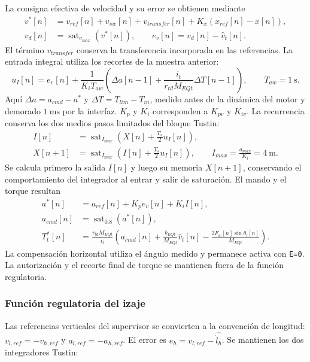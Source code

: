 \documentclass[a4paper,10pt,onecolumn,journal]{ieeeconf}
\numberwithin{equation}{section}
\begin{document}
La consigna efectiva de velocidad y su error se obtienen mediante
\begin{align}
v^*[n]&=v_{ref}[n]+v_{sw}[n]+v_{transfer}[n]+K_x(x_{ref}[n]-x[n]),\\
v_d[n]&=\operatorname{sat}_{v_{max}}(v^*[n]),\qquad e_v[n]=v_d[n]-\widehat v_t[n].
\end{align}
El término $v_{transfer}$ conserva la transferencia incorporada en las referencias. La entrada integral utiliza los recortes de la muestra anterior:
\begin{equation}
u_I[n]=e_v[n]+\frac{1}{K_iT_{aw}}\left(\Delta a[n-1]+\frac{i_t}{r_{td}M_{EQt}}\Delta T[n-1]\right),\qquad T_{aw}=1~\mathrm{s}.
\end{equation}
Aquí $\Delta a=a_{cmd}-a^*$ y $\Delta T=T_{lim}-T_{in}$, medido antes de la dinámica del motor y demorado $1~\mathrm{ms}$ por la interfaz. $K_p$ y $K_i$ corresponden a $K_{pv}$ y $K_{iv}$. La recurrencia conserva los dos medios pasos limitados del bloque Tustin:
\begin{align}
I[n]&=\operatorname{sat}_{I_{max}}\left(X[n]+\frac{T_s}{2}u_I[n]\right),\\
X[n+1]&=\operatorname{sat}_{I_{max}}\left(I[n]+\frac{T_s}{2}u_I[n]\right),\qquad I_{max}=\frac{a_{max}}{K_i}=4~\mathrm{m}.
\end{align}
Se calcula primero la salida $I[n]$ y luego su memoria $X[n+1]$, conservando el comportamiento del integrador al entrar y salir de saturación. El mando y el torque resultan
\begin{align}
a^*[n]&=a_{ref}[n]+K_p e_v[n]+K_i I[n],\\
a_{cmd}[n]&=\operatorname{sat}_{0.8}(a^*[n]),\\
T_t^*[n]&=\frac{r_{td}M_{EQt}}{i_t}\left(a_{cmd}[n]+\frac{b_{EQt}}{M_{EQt}}\widehat v_t[n]-\frac{2F_w[n]\sin\theta_l[n]}{M_{EQt}}\right).
\end{align}
La compensación horizontal utiliza el ángulo medido y permanece activa con \texttt{E=0}. La autorización y el recorte final de torque se mantienen fuera de la función regulatoria.

\subsubsection{Función regulatoria del izaje}

Las referencias verticales del supervisor se convierten a la convención de longitud: $v_{l,ref}=-v_{h,ref}$ y $a_{l,ref}=-a_{h,ref}$. El error es $e_h=v_{l,ref}-\widehat{\dot l_h}$. Se mantienen los dos integradores Tustin:
\end{document}
